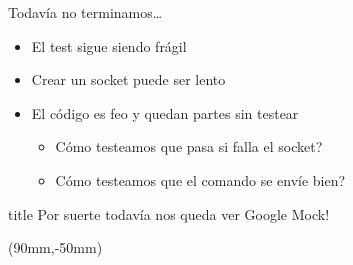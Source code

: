\begin{frame}[t]{Todav\'ia no terminamos\ldots}
\bigskip
\begin{itemize}
	\item El test sigue siendo fr\'agil
	\item Crear un socket puede ser lento
	\item El c\'odigo es feo y quedan partes sin testear \\
		\begin{itemize}
			\item \textquestiondown C\'omo testeamos que pasa si falla el socket?
			\item \textquestiondown C\'omo testeamos que el comando se env\'ie bien?
		\end{itemize}
\end{itemize}
\bigskip
\begin{beamercolorbox}[sep=.1cm,shadow=true,rounded=true,center]{title}
	Por suerte todav\'ia nos queda ver Google Mock!
\end{beamercolorbox}

\begin{textblock*}{30mm}(90mm,-50mm)
\end{textblock*}
\end{frame}

